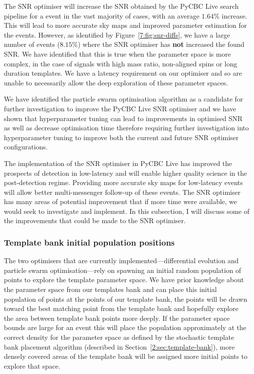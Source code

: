 The SNR optimiser will increase the SNR obtained by the PyCBC Live search pipeline for a \gwadj event in the vast majority of cases, with an average $1.64\%$ increase. This will lead to more accurate sky maps and improved parameter estimation for the \gwadj events. However, as identified by Figure~\ref{7:fig:snr-diffs}, we have a large number of events ($8.15\%$) where the SNR optimiser has \textbf{not} increased the found SNR. We have identified that this is true when the parameter space is more complex, in the case of signals with high mass ratio, non-aligned spins or long duration templates. We have a latency requirement on our optimiser and so are unable to necessarily allow the deep exploration of these parameter spaces.


We have identified the particle swarm optimisation algorithm as a candidate for further investigation to improve the PyCBC Live SNR optimiser and we have shown that hyperparameter tuning can lead to improvements in optimised SNR as well as decrease optimisation time therefore requiring further investigation into hyperparameter tuning to improve both the current and future SNR optimiser configurations.

The implementation of the SNR optimiser in PyCBC Live has improved the prospects of \gwadj detection in low-latency and will enable higher quality science in the post-detection regime. Providing more accurate sky maps for low-latency events will allow better multi-messenger follow-up of these events. The SNR optimiser has many areas of potential improvement that if more time were available, we would seek to investigate and implement. In this subsection, I will discuss some of the improvements that could be made to the SNR optimiser.

\subsubsection{Template bank initial population positions}

The two optimisers that are currently implemented---differential evolution and particle swarm optimisation---rely on spawning an initial random population of points to explore the template parameter space. We have prior knowledge about the parameter space from our templates bank and can place this initial population of points at the points of our template bank, the points will be drawn toward the best matching point from the template bank and hopefully explore the area between template bank points more deeply. If the parameter space bounds are large for an event this will place the population approximately at the correct density for the parameter space as defined by the stochastic template bank placement algorithm (described in Section~\ref{2:sec:template-bank}), more densely covered areas of the template bank will be assigned more initial points to explore that space.

